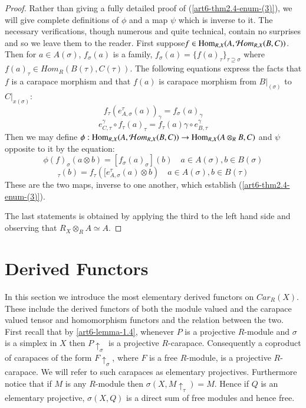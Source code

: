 \begin{proof}
Rather than giving a fully detailed proof of (\ref{art6-thm2.4-enum-(3)}), we will give complete definitions of $\phi$ and a map $\psi$ which is inverse to it. The necessary verifications, though numerous and quite technical, contain no surprises and so we leave them to the reader. First suppose\break $f \in \operatorname{Hom}_{R,X}(A, \mathcal{H} om_{R,X}(B, C))$. Then for
$a \in A(\sigma)$, $f_{\sigma}(a)$ is a family, $f_{\sigma}(a)  =\{f(a)_{\tau}\}_{\tau \supseteq \sigma}$ where
$f(a)_{\tau} \in Hom_{R}(B(\tau), C(\tau))$. The following equations express the facts that $f$ is a carapace morphism and that $f(a)$ is carapace morphism from $B|_(\sigma)$ to $C|_{x(\sigma)}$:
\begin{equation}
f_{\tau}(e_{A,\sigma}^{\tau}(a))_{\gamma} = f_{\sigma}(a)_{\gamma}\tag{5}\label{eq:proof-5}
\end{equation}
\begin{equation}
e_{C, \tau}^{\gamma} \circ f_{\tau}(a)_{\tau} = f_{\tau}(a)\gamma \circ e_{B,\tau}^{\gamma}\tag{6}\label{eq:proof-6}
\end{equation}
Then we may define $\phi : \operatorname{Hom}_{R,X}(A, \mathcal{H} om_{R,X}(B,C))\rightarrow \operatorname{Hom}_{R,X}(A \otimes_{R}B, C)$ and $\psi$ opposite to it by the equation:
\begin{equation}
\phi(f)_{\sigma}(a\otimes b) =[f_{\sigma}(a)_{\sigma}](b) \quad a\in A(\sigma), b\in B(\sigma)\tag{7}\label{eq:proof-7}
\end{equation}
\begin{equation}
[\phi (F)_{\sigma}(a)]_{\tau}(b) = f_{\tau}([e_{A, \sigma}^{\tau}(a)\otimes b) \quad a\in A(\sigma), b \in B(\tau)\tag{8}\label{eq:proof-8}
\end{equation}
These are the two maps, inverse to one another, which establish (\ref{art6-thm2.4-enum-(3)}).

The last statements is obtained by applying the third to the left hand side and observing that $R_{X}\otimes_{R}A\simeq A$.
\end{proof}

\section{Derived Functors}

In this section we introduce the most elementary derived functors on $C ar_{R}(X)$. These include the derived functors of both the module valued and the carapace valued tensor and homomorphism functors and the relation between the two. First recall that by \ref{art6-lemma-1.4}, whenever $P$ is a projective $R$-module and $\sigma$ is a simplex in $X$ then $P\uparrow_{\sigma}$ is a projective $R$-carapace. Consequently a coproduct of carapaces of the form $F \uparrow_{\sigma}$, where $F$ is a free $R$-module, is a projective $R$-carapace. We will refer to such carapaces as elementary projectives. Furthermore notice that if $M$ is any $R$-module then $\sigma(X, M\uparrow_{\tau})=M$. Hence if $Q$ is an elementary projective, $\sigma(X, Q)$ is a direct sum of free modules and hence free.

